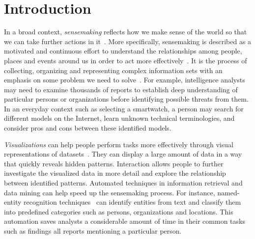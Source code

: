 \chapter{Introduction}
\label{chap:intro}

\graphicspath{{Chapter1/figures/}}

In a broad context, \emph{sensemaking} reflects how we make sense of the world so that we can take further actions in it~\cite{Snowden2005}. More specifically, sensemaking is described as a motivated and continuous effort to understand the relationships among people, places and events around us in order to act more effectively~\cite{Klein2006a}. It is the process of collecting, organizing and representing complex information sets with an emphasis on some problem we need to solve~\cite{Russell2008}. For example, intelligence analysts may need to examine thousands of reports to establish deep understanding of particular persons or organizations before identifying possible threats from them. In an everyday context such as selecting a smartwatch, a person may search for different models on the Internet, learn unknown technical terminologies, and consider pros and cons between these identified models. 

\emph{Visualizations} can help people perform tasks more effectively through visual representations of datasets~\cite{Munzner2014}. They can display a large amount of data in a way that quickly reveals hidden patterns. Interaction allows people to further investigate the visualized data in more detail and explore the relationship between identified patterns. Automated techniques in information retrieval and data mining can help speed up the sensemaking process. For instance, named-entity recognition techniques~\cite{Nadeau2007} can identify entities from text and classify them into predefined categories such as persons, organizations and locations. This automation saves analysts a considerable amount of time in their common tasks such as findings all reports mentioning a particular person. 

